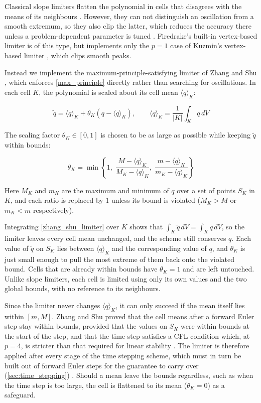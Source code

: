 \documentclass{article}
\begin{document}
Classical slope limiters flatten the polynomial in cells that disagrees with the means of its neighbours \cite{CockburnShu1991}.
However, they can not distinguish an oscillation from a smooth extremum, so they also clip the latter, which reduces the accuracy there unless a problem-dependent parameter is tuned \cite{CockburnShu1991}.
Firedrake's built-in vertex-based limiter is of this type, but implements only the $p=1$ case of Kuzmin's vertex-based limiter \cite{Kuzmin2010}, which clips smooth peaks.

Instead we implement the maximum-principle-satisfying limiter of Zhang and Shu \cite{ZhangShu2010}, which enforces \cref{max_principle} directly rather than searching for oscillations.
In each cell $K$, the polynomial is scaled about its cell mean $\langle q \rangle_K$:

\begin{equation}\label{zhang_shu_limiter}
    \tilde q = \langle q \rangle_K + \theta_K \left( q - \langle q \rangle_K \right), \qquad \langle q \rangle_K = \frac{1}{|K|} \int_K q \,dV
\end{equation}

The scaling factor $\theta_K \in [0, 1]$ is chosen to be as large as possible while keeping $\tilde q$ within bounds:

\begin{equation}\label{zhang_shu_theta}
    \theta_K = \min \left\{ 1, \; \frac{M - \langle q \rangle_K}{M_K - \langle q \rangle_K}, \; \frac{m - \langle q \rangle_K}{m_K - \langle q \rangle_K} \right\}
\end{equation}

Here $M_K$ and $m_K$ are the maximum and minimum of $q$ over a set of points $S_K$ in $K$, and each ratio is replaced by $1$ unless its bound is violated ($M_K > M$ or $m_K < m$ respectively).

Integrating \cref{zhang_shu_limiter} over $K$ shows that $\int_K \tilde q \,dV = \int_K q \,dV$, so the limiter leaves every cell mean unchanged, and the scheme still conserves $q$.
Each value of $\tilde q$ on $S_K$ lies between $\langle q \rangle_K$ and the corresponding value of $q$, and $\theta_K$ is just small enough to pull the most extreme of them back onto the violated bound.
Cells that are already within bounds have $\theta_K = 1$ and are left untouched.
Unlike slope limiters, each cell is limited using only its own values and the two global bounds, with no reference to its neighbours.

Since the limiter never changes $\langle q \rangle_K$, it can only succeed if the mean itself lies within $[m, M]$.
Zhang and Shu proved that the cell means after a forward Euler step stay within bounds, provided that the values on $S_K$ were within bounds at the start of the step, and that the time step satisfies a CFL condition which, at $p = 4$, is stricter than that required for linear stability \cite{ZhangShu2010}.
The limiter is therefore applied after every stage of the time stepping scheme, which must in turn be built out of forward Euler steps for the guarantee to carry over (\cref{sec:time_stepping}) \cite{ZhangShu2010}.
Should a mean leave the bounds regardless, such as when the time step is too large, the cell is flattened to its mean ($\theta_K = 0$) as a safeguard.
\end{document}
